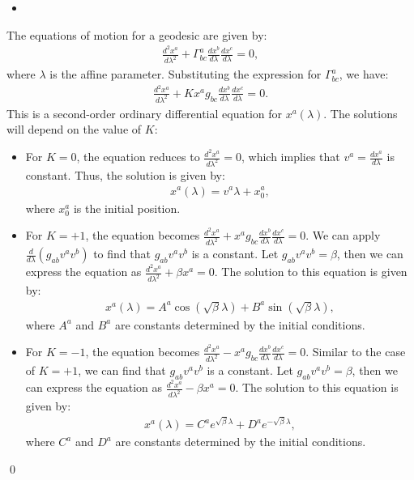 \begin{itemize}
    \item [(c)]
\end{itemize}
The equations of motion for a geodesic are given by:
\begin{align}
    \frac{d^2 x^a}{d\lambda^2} + \Gamma^a_{bc} \frac{dx^b}{d\lambda} \frac{dx^c}{d\lambda} = 0,
\end{align}
where $\lambda$ is the affine parameter. Substituting the expression for $\Gamma^a_{bc}$, we have:
\begin{align}
    \frac{d^2 x^a}{d\lambda^2} + K x^a g_{bc} \frac{dx^b}{d\lambda} \frac{dx^c}{d\lambda} = 0.
\end{align}
This is a second-order ordinary differential equation for $x^a(\lambda)$. The solutions will depend on the value of $K$:
\begin{itemize}
    \item For $K=0$, the equation reduces to $\frac{d^2 x^a}{d\lambda^2} = 0$, which implies that $v^a= \frac{dx^a}{d\lambda}$ is constant. Thus, the solution is given by:
    \begin{align}
        x^a(\lambda) = v^a \lambda + x_0^a,
    \end{align}
    where $x_0^a$ is the initial position.
    \item For $K=+1$, the equation becomes $\frac{d^2 x^a}{d\lambda^2} + x^a g_{bc} \frac{dx^b}{d\lambda} \frac{dx^c}{d\lambda} = 0$. We can apply $\frac{d}{d\lambda}(g_{ab} v^a v^b)$ to find that $g_{ab} v^a v^b$ is a constant. Let $g_{ab} v^a v^b = \beta$, then we can express the equation as $\frac{d^2 x^a}{d\lambda^2} + \beta x^a = 0$. The solution to this equation is given by:
    \begin{align}
        x^a(\lambda) = A^a \cos(\sqrt{\beta} \lambda) + B^a \sin(\sqrt{\beta} \lambda),
    \end{align}
    where $A^a$ and $B^a$ are constants determined by the initial conditions.
    \item For $K=-1$, the equation becomes $\frac{d^2 x^a}{d\lambda^2} - x^a g_{bc} \frac{dx^b}{d\lambda} \frac{dx^c}{d\lambda} = 0$. Similar to the case of $K=+1$, we can find that $g_{ab} v^a v^b$ is a constant. Let $g_{ab} v^a v^b = \beta$, then we can express the equation as $\frac{d^2 x^a}{d\lambda^2} - \beta x^a = 0$. The solution to this equation is given by:
    \begin{align}
        x^a(\lambda) = C^a e^{\sqrt{\beta} \lambda} + D^a e^{-\sqrt{\beta} \lambda},
    \end{align}
    where $C^a$ and $D^a$ are constants determined by the initial conditions.
\end{itemize}
\qed

